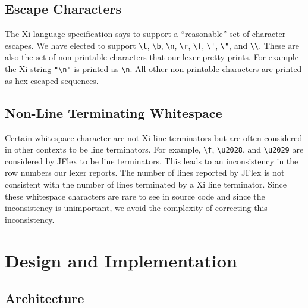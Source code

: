 \documentclass{hw}
\begin{document}
\subsection{Escape Characters}
The Xi language specification says to support a ``reasonable'' set of character
escapes. We have elected to support \verb$\t$, \verb$\b$, \verb$\n$, \verb$\r$,
\verb$\f$, \verb$\'$, \verb$\"$, and \verb$\\$. These are also the set of
non-printable characters that our lexer pretty prints. For example the Xi
string \verb$"\n"$ is printed as \verb$\n$. All other non-printable
characters are printed as hex escaped sequences.

\subsection{Non-Line Terminating Whitespace}
Certain whitespace character are not Xi line terminators but are often
considered in other contexts to be line terminators. For example, \verb$\f$,
\verb$\u2028$, and \verb$\u2029$ are considered by JFlex to be line
terminators.  This leads to an inconsistency in the row numbers our lexer
reports. The number of lines reported by JFlex is not consistent with the
number of lines terminated by a Xi line terminator. Since these whitespace
characters are rare to see in source code and since the inconsistency is
unimportant, we avoid the complexity of correcting this inconsistency.

\section{Design and Implementation}\label{sec:design}
\subsection{Architecture}
\begin{center}
\end{center}
\end{document}
